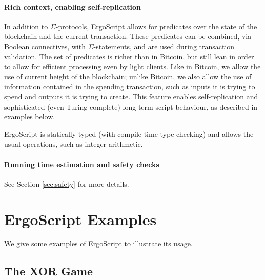 \documentclass[11pt]{article}
\newcommand{\authnote}[2]{\marginpar{\parbox{\marginparwidth}{\tiny %
  \textsf{#1 {\textcolor{blue}{notes: #2}}}}}%
  \textcolor{blue}{\textbf{\dag}}}
\newcommand{\authnote}[2]{
  \textsf{#1 \textcolor{blue}{: #2}}}
\newcommand{\authnote}[2]{}
\newcommand{\lnote}[1]{{\authnote{\textcolor{orange}{Leo notes}}{#1}}}
\newcommand{\snote}[1]{{\authnote{\textcolor{yellow}{Scalahub notes}}{#1}}}
\newcommand{\langname}{ErgoScript\xspace}
\begin{document}
\paragraph{Rich context, enabling self-replication}
In addition to $\Sigma$-protocols, \langname allows for predicates over the state of the blockchain and the current transaction. These predicates can be combined, via Boolean connectives, with $\Sigma$-statements, and are used during transaction validation. The set of predicates is richer than in Bitcoin, but still lean in order to allow for efficient processing even by light clients. Like in Bitcoin, we allow the use of current height of the blockchain; unlike Bitcoin, we also allow the use of information contained in the spending transaction, such as inputs it is trying to spend and outputs it is trying to create. This feature enables self-replication and sophisticated (even Turing-complete) long-term script behaviour, as described in examples below.

\langname is statically typed (with compile-time type checking) and allows the usual operations, such as integer arithmetic.

\snote{This seems incomplete. In particular, we should describe all context variables and operations allowed, possibly using BNF or some grammar.}


\paragraph{Running time estimation and safety checks}
\lnote{someone should fill this in, because I know very little about it}
See Section \ref{sec:safety} for more details.

\section{\langname Examples}

We give some examples of \langname to illustrate its usage. 
\subsection{The XOR Game}
\end{document}
